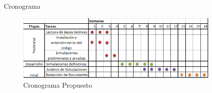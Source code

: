 \documentclass{beamer}
\begin{document}
\begin{frame}{Cronograma}
	\centering
	\begin{figure}%
		\includegraphics[width=0.9\textwidth]{im/cronograma.png}%
		\caption{Cronograma Propuesto}%
		\label{fig:crono}%
	\end{figure}
			
\end{frame}
\end{document}
